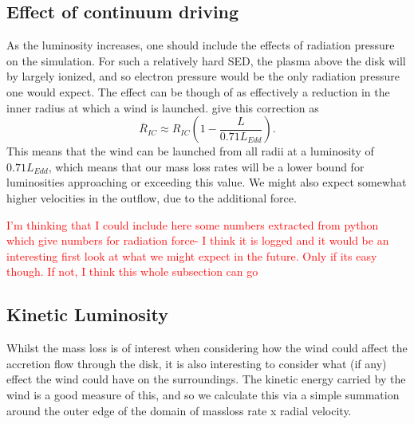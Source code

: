 \documentclass[a4paper,fleqn,usenatbib]{mnras}
\begin{document}
\subsection{Effect of continuum driving}

As the luminosity increases, one should include the effects
of radiation pressure on the simulation. For such a relatively hard SED, 
the plasma above the disk will by largely ionized, and so electron
pressure would be the only radiation pressure one would expect. The 
effect can be though of as effectively a reduction in the inner radius
at which a wind is launched. \cite{2018MNRAS.473..838D} give this 
correction as
\begin{equation}
\overline{R}_{IC}\approx R_{IC}\left(1-\frac{L}{0.71L_{Edd}}\right).
\end{equation}
This means that the wind can be launched from all radii at a luminosity
of $0.71 L_{Edd}$, which means that our mass loss rates will be a lower 
bound for luminosities approaching or exceeding this value. We might also 
expect somewhat higher velocities in the outflow, due to the additional force.

\textcolor{red}{I'm thinking that I could include here some numbers extracted from python 
which give numbers for radiation force- I think it is logged and it would be an 
interesting first look at what we might expect in the future. Only if its easy though.
If not, I think this whole subsection can go}

\subsection{Kinetic Luminosity}
Whilst the mass loss is of interest when considering how the wind could affect the 
accretion flow through the disk, it is also interesting to consider what (if any) effect the
wind could have on the surroundings. The kinetic energy carried by the wind is a
good measure of this, and so we calculate this via a simple summation around the outer
edge of the domain of massloss rate x radial velocity. 
\end{document}

